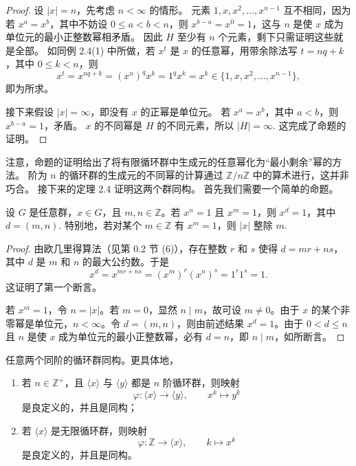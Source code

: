 \begin{proof}
设 \(|x| = n\)，先考虑 \(n < \infty\) 的情形。
元素 \(1, x, x^2, \ldots, x^{n-1}\) 互不相同，因为若 \(x^a = x^b\)，其中不妨设 \(0 \leq a < b < n\)，则 \(x^{b-a} = x^0 = 1\)，这与 \(n\) 是使 \(x\) 成为单位元的最小正整数幂相矛盾。
因此 \(H\) 至少有 \(n\) 个元素，剩下只需证明这些就是全部。
如同例 2.4(1) 中所做，若 \(x^t\) 是 \(x\) 的任意幂，用带余除法写 \(t = nq + k\)，其中 \(0 \leq k < n\)，则
\[
x^t = x^{nq+k} = (x^n)^q x^k = 1^q x^k = x^k \in \{1, x, x^2, \ldots, x^{n-1}\},
\]
即为所求。

接下来假设 \(|x| = \infty\)，即没有 \(x\) 的正幂是单位元。
若 \(x^a = x^b\)，其中 \(a < b\)，则 \(x^{b-a} = 1\)，矛盾。
\(x\) 的不同幂是 \(H\) 的不同元素，所以 \(|H| = \infty\). 
这完成了命题的证明。
\end{proof}

注意，命题的证明给出了将有限循环群中生成元的任意幂化为“最小剩余”幂的方法。
阶为 \(n\) 的循环群的生成元的不同幂的计算通过 \(\mathbb{Z}/n\mathbb{Z}\) 中的算术进行，这并非巧合。
接下来的定理 2.4 证明这两个群同构。
首先我们需要一个简单的命题。

\begin{proposition}
设 \(G\) 是任意群，\(x \in G\)，且 \(m, n \in \mathbb{Z}\)。若 \(x^n = 1\) 且 \(x^m = 1\)，则 \(x^d = 1\)，其中 \(d = (m, n)\). 特别地，若对某个 \(m \in \mathbb{Z}\) 有 \(x^m = 1\)，则 \(|x|\) 整除 \(m\).
\end{proposition}

\begin{proof}
由欧几里得算法（见第 0.2 节 (6)），存在整数 \(r\) 和 \(s\) 使得 \(d = mr + ns\)，其中 \(d\) 是 \(m\) 和 \(n\) 的最大公约数。于是
\[
x^d = x^{mr+ns} = (x^m)^r (x^n)^s = 1^r 1^s = 1.
\]
这证明了第一个断言。

若 \(x^m = 1\)，令 \(n = |x|\)。若 \(m = 0\)，显然 \(n \mid m\)，故可设 \(m \neq 0\)。由于 \(x\) 的某个非零幂是单位元，\(n < \infty\)。令 \(d = (m, n)\)，则由前述结果 \(x^d = 1\)。由于 \(0 < d \leq n\) 且 \(n\) 是使 \(x\) 成为单位元的最小正整数幂，必有 \(d = n\)，即 \(n \mid m\)，如所断言。
\end{proof}

\begin{theorem}\label{thm:2.1}
任意两个同阶的循环群同构。更具体地，
\begin{enumerate}[label=(\arabic*)]
\item 若 \(n \in \mathbb{Z}^+\)，且 \(\langle x \rangle\) 与 \(\langle y \rangle\) 都是 \(n\) 阶循环群，则映射
\[
\varphi : \langle x \rangle \to \langle y \rangle,\qquad x^k \mapsto y^k
\]
是良定义的，并且是同构；
\item 若 \(\langle x \rangle\) 是无限循环群，则映射
\[
\varphi : \mathbb{Z} \to \langle x \rangle,\qquad k \mapsto x^k
\]
是良定义的，并且是同构。
\end{enumerate}
\end{theorem}

